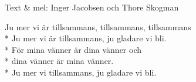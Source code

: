 \begin{SongText}
    \begin{SongInfo}
        Text \& mel: Inger Jacobsen och Thore Skogman
    \end{SongInfo}
    \begin{SongVerse}
        Ju mer vi är tillsammans, tillsammans, tillsammans\\*%
        Ju mer vi är tillsammans, ju gladare vi bli.\\*%
        För mina vänner är dina vänner och\\*%
        dina vänner är mina vänner.\\*%
        Ju mer vi tillsammans, ju gladare vi bli. 
    \end{SongVerse}
\end{SongText}
